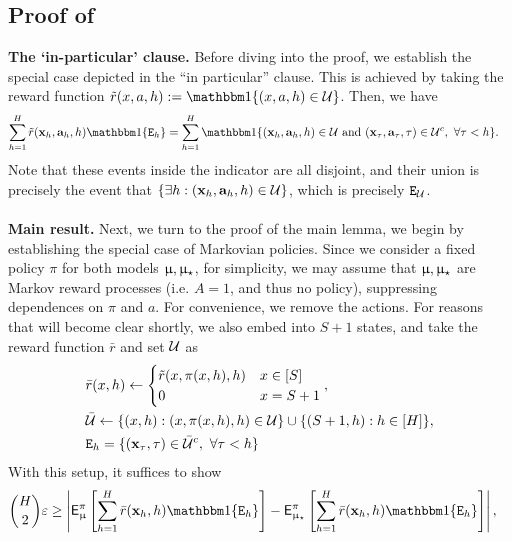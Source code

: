 \subsection{Proof of   \label{proof:visitation_comparison_general}}


	\newcommand{\barmod}{\bar{\model}}
	\newcommand{\barmodst}{\bar{\model}_{\star}}
	\newcommand{\rbar}{\bar{r}}
	\newcommand{\calUbar}{\bar{\calU}}

	{\textbf{The `in-particular' clause.}} Before diving into the proof, we establish the special case depicted in the ``in particular'' clause. This is achieved by taking the reward function $\rtil(x,a,h) := \ind\{(x,a,h) \in \calU\}$. Then, we have
	\begin{align*}
	\sum_{h=1}^H \rtil(\bmx_h,\bma_h,h) \ind\{\scrE_h\} &=  \sum_{h=1}^H  \ind\{(\bmx_h,\bma_h,h) \in \calU \text{ and } (\bmx_\tau,\bma_{\tau},\tau) \in \calU^c,~ \forall \tau < h\}.
	\end{align*}
	Note that these events inside the indicator are all disjoint, and their union is precisely the event that $\{\exists h: (\mathbf{x}_h,\mathbf{a}_h,h) \in \mathcal{U}\}$, which is precisely $\texttt{E}_{\mathcal{U}}$.
	\\
	\\
	{\textbf{Main result.}} Next, we turn to the proof of the main lemma, we begin by establishing the special case of Markovian policies. Since we consider a fixed policy $\pi$ for both models $\upmu,\upmu_{\star}$, for simplicity, we may assume that $\upmu,\upmu_{\star}$ are Markov reward processes (i.e.  $A = 1$, and thus no policy), suppressing dependences on $\pi$ and $a$. For convenience, we remove the actions. For reasons that will become clear shortly, we also embed into $S+1$ states, and take the reward function $\rbar$ and set $\mathcal{U}$ as
	\begin{align*}
	&\rbar(x,h) \gets \begin{cases}\rtil(x,\pi(x,h),h)&  x \in [S]\\
	0 & x = S+1 \end{cases}, \\
	&\calUbar \gets \{(x,h): (x,\pi(x,h),h) \in \calU\} \cup \{(S+1,h) : h \in [H]\},\\
	&\scrE_h = \{(\bmx_{\tau},\tau) \in \calUbar^c, ~\forall \tau < h\}
	\end{align*}
	With this setup, it suffices to show
	\begin{align}
	\binom{H}{2}\varepsilon &\ge   \left|\sfE^{\pi}_{\model}\left[\sum_{h=1}^H \rbar(\bmx_h,h) \ind\{\scrE_h\}\right] - \sfE^{\pi}_{\modst}\left[\sum_{h=1}^H \rbar(\bmx_h,h) \ind\{\scrE_h\}\right]\right|, \label{eq:MDP_desired}
	\end{align}
